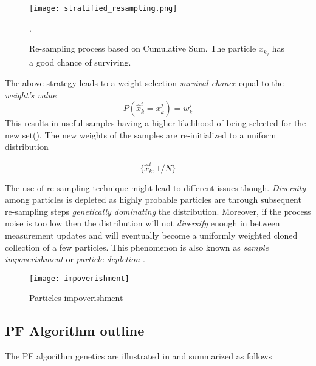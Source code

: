 \begin{figure}[H]
	\centering
	\texttt{[image: stratified\_resampling.png]}
	\caption{Re-sampling process based on Cumulative Sum. The particle $x_{k_j}$ has a good chance of surviving.}.
	\label{fig:CSW}
\end{figure}


The above strategy leads to a weight selection \emph{survival chance} equal to the \emph{weight's value}
$$P(\hat{x}_k^i = x_k^j) = w_k^j$$ This results in useful samples having a higher likelihood of being selected for the new set(). The new weights of the samples are re-initialized to a uniform distribution

\begin{equation}\label{eq:normalize2CSW}
	\{\hat{x}_k^i , 1/N\}
\end{equation}



The use of re-sampling technique might lead to different issues though. \emph{Diversity} among particles is depleted as highly probable particles are through subsequent re-sampling steps \emph{genetically dominating} the distribution. Moreover, if the process noise is too low then the distribution will not \emph{diversify} enough in between measurement updates and will eventually become a uniformly weighted cloned collection of a few particles. This phenomenon is also known as \emph{sample impoverishment} or \emph{particle depletion}  \cite{Chatzi2002}.

\begin{figure}[H]
	\centering
	\texttt{[image: impoverishment]}
	\caption{Particles impoverishment \cite{Ju2019}}
	\label{fig:impoverishment}
\end{figure}


\subsection{PF Algorithm outline}


The PF algorithm genetics are illustrated in  and summarized as follows

